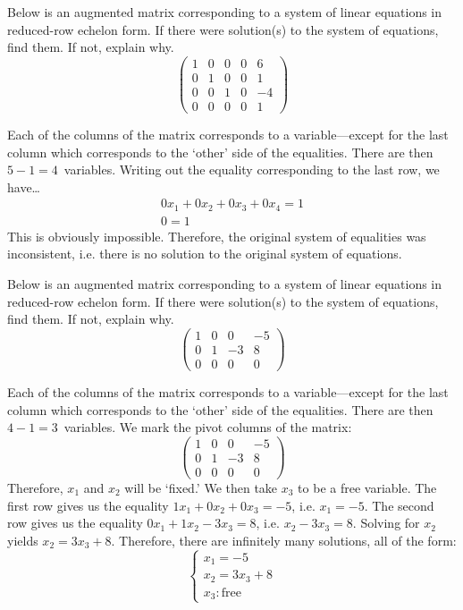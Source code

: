 \documentclass[12pt,letterpaper]{exam}
\begin{document}
\begin{questions}
\newpage
\question[10] Below is an augmented matrix corresponding to a system of linear equations in reduced-row echelon form. If there were solution(s) to the system of equations, find them. If not, explain why. 
	\[
	\begin{pmatrix}
	1 & 0 & 0 & 0 & 6 \\
	0 & 1 & 0 & 0 & 1 \\
	0 & 0 & 1 & 0 & -4 \\
	0 & 0 & 0 & 0 & 1 
	\end{pmatrix}	
	\] \pspace

\sol Each of the columns of the matrix corresponds to a variable---except for the last column which corresponds to the `other' side of the equalities. There are then $5 - 1= 4$~variables. Writing out the equality corresponding to the last row, we have\dots
	\[
	\begin{gathered}
	0x_1 + 0x_2 + 0x_3 + 0x_4= 1 \\
	0= 1
	\end{gathered}
	\]
This is obviously impossible. Therefore, the original system of equalities was inconsistent, i.e. there is no solution to the original system of equations. 



\newpage
\question[10] Below is an augmented matrix corresponding to a system of linear equations in reduced-row echelon form. If there were solution(s) to the system of equations, find them. If not, explain why. 
	\[
	\begin{pmatrix}
	1 & 0 & 0 & -5 \\
	0 & 1 & -3 & 8 \\
	0 & 0 & 0 & 0
	\end{pmatrix}	
	\] \pspace

\sol Each of the columns of the matrix corresponds to a variable---except for the last column which corresponds to the `other' side of the equalities. There are then $4 - 1= 3$~variables. We mark the pivot columns of the matrix: 
	\[
	\begin{pmatrix}
	\boxed{1} & 0 & 0 & -5 \\
	0 & \boxed{1} & -3 & 8 \\
	0 & 0 & 0 & 0
	\end{pmatrix}	
	\]
Therefore, $x_1$ and $x_2$ will be `fixed.' We then take $x_3$ to be a free variable. The first row gives us the equality $1x_1 + 0x_2 + 0x_3= -5$, i.e. $x_1= -5$. The second row gives us the equality $0x_1 + 1x_2 - 3x_3= 8$, i.e. $x_2 - 3x_3= 8$. Solving for $x_2$ yields $x_2= 3x_3 + 8$. Therefore, there are infinitely many solutions, all of the form:
	\[
	\begin{cases}
	x_1= -5 \\
	x_2= 3x_3 + 8 \\
	x_3 \colon \text{free}
	\end{cases}
	\]




\end{questions}
\end{document}
